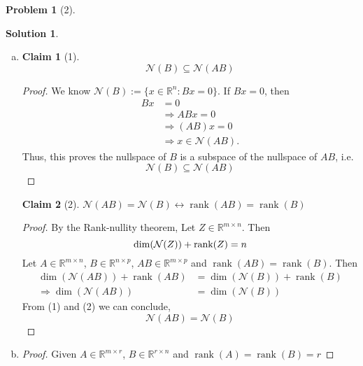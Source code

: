 \documentclass{amsart}[11pt]
\newtheorem*{claim}{Claim}
\theoremstyle{definition}
\newtheorem*{problem}{Problem}
\newtheorem{solution}{Solution}
\newcommand{\R}{\mathbb{R}}
\newcommand{\row}{\textnormal{Row}}
\newcommand{\rank}{\textnormal{rank}}
\begin{document}
\begin{problem}[2]
\begin{solution}
\begin{enumerate}[(a)]
\begin{proof}
            \noindent $\therefore$ $\mathcal{N}(A)$ is orthogonal to $\row(A)$ 
        \end{proof}
        \vspace{\baselineskip}
        \item \begin{claim}[1]
            \[ \mathcal{N}(B) \subseteq \mathcal{N}(AB)\]
        \end{claim}
        \begin{proof}
            We know $\mathcal{N}(B):=\{x\in\R^n:Bx=0\}$. If $Bx=0$, then
            \begin{align*}
                Bx &= 0 \\
                &\Rightarrow ABx = 0 \\
                &\Rightarrow (AB)x = 0 \\
                &\Rightarrow x \in \mathcal{N}(AB).
            \end{align*}
            Thus, this proves the nullspace of $B$ is a subspace of the nullspace of $AB$, i.e.
            \[\mathcal{N}(B) \subseteq \mathcal{N}(AB)\tag{1}\]
        \end{proof}
        \begin{claim}[2]
            $\mathcal{N}(AB)=\mathcal{N}(B) \leftrightarrow \operatorname{rank}(AB)=\operatorname{rank}(B)$ 
        \end{claim}
        \begin{proof}
            By the Rank-nullity theorem, Let $Z\in\R^{m\times n}$.  Then
            \[ \dim(\mathcal{N}(Z))+\rank(Z) = n \]
            Let $A\in \R^{m \times n}$, $B\in\R^{n \times p}$, $AB\in\R^{m\times p}$ and $\operatorname{rank}(AB)=\operatorname{rank}(B)$. Then
            \begin{align*}
                \dim(\mathcal{N}(AB)) + \operatorname{rank}(AB) &= \dim(\mathcal{N}(B)) + \operatorname{rank}(B) \\
                \Rightarrow\dim(\mathcal{N}(AB))&=\dim(\mathcal{N}(B))
                \tag{2}
            \end{align*}
            From (1) and (2) we can conclude,
            \[\mathcal{N}(AB)=\mathcal{N}(B)\]
        \end{proof} 
        \vspace{\baselineskip}
        \item \begin{proof}
            Given $A\in\R^{m\times r}$, $B\in\R^{r\times n}$ and $\operatorname{rank}(A) = \operatorname{rank}(B)=r$


\end{proof}
\end{enumerate}
\end{solution}
\end{problem}
\end{document}
